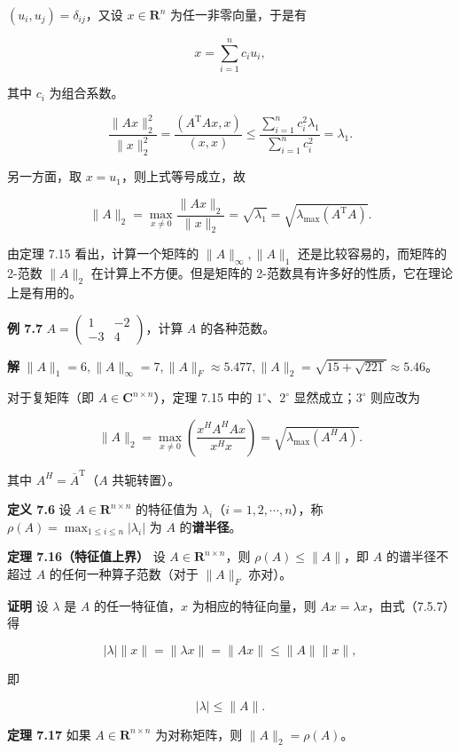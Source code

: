 \((u_i,u_j)=\delta_{ij}\)，又设 \(x\in\mathbf R^n\) 为任一非零向量，于是有

\[
x=\sum_{i=1}^{n}c_iu_i,
\]

其中 \(c_i\) 为组合系数。

\[
\frac{\|Ax\|_2^2}{\|x\|_2^2}
=\frac{(A^{\mathrm T}Ax,x)}{(x,x)}
\leqslant\frac{\sum_{i=1}^{n}c_i^2\lambda_1}{\sum_{i=1}^{n}c_i^2}=\lambda_1.
\]

另一方面，取 \(x=u_1\)，则上式等号成立，故

\[
\|A\|_2=\max_{x\neq0}\frac{\|Ax\|_2}{\|x\|_2}=\sqrt{\lambda_1}=\sqrt{\lambda_{\max}(A^{\mathrm T}A)}.
\]

由定理 7.15 看出，计算一个矩阵的 \(\|A\|_\infty,\|A\|_1\) 还是比较容易的，而矩阵的 2-范数 \(\|A\|_2\) 在计算上不方便。但是矩阵的 2-范数具有许多好的性质，它在理论上是有用的。

\textbf{例 7.7} \(A=\begin{pmatrix}1&-2\\-3&4\end{pmatrix}\)，计算 \(A\) 的各种范数。

\textbf{解} \(\|A\|_1=6,\|A\|_\infty=7,\|A\|_F\approx5.477,\|A\|_2=\sqrt{15+\sqrt{221}}\approx5.46\)。

对于复矩阵（即 \(A\in\mathbf C^{n\times n}\)），定理 7.15 中的 \(1^\circ\)、\(2^\circ\) 显然成立；\(3^\circ\) 则应改为

\[
\|A\|_2=\max_{x\neq0}\left(\frac{x^HA^HAx}{x^Hx}\right)=\sqrt{\lambda_{\max}(A^HA)}.
\]

其中 \(A^H=\overline A^{\mathrm T}\)（\(A\) 共轭转置）。

\textbf{定义 7.6} 设 \(A\in\mathbf R^{n\times n}\) 的特征值为 \(\lambda_i\)（\(i=1,2,\cdots,n\)），称 \(\rho(A)=\max_{1\leqslant i\leqslant n}|\lambda_i|\) 为 \(A\) 的\textbf{谱半径}。

\textbf{定理 7.16（特征值上界）} 设 \(A\in\mathbf R^{n\times n}\)，则 \(\rho(A)\leqslant\|A\|\)，即 \(A\) 的谱半径不超过 \(A\) 的任何一种算子范数（对于 \(\|A\|_F\) 亦对）。

\textbf{证明} 设 \(\lambda\) 是 \(A\) 的任一特征值，\(x\) 为相应的特征向量，则 \(Ax=\lambda x\)，由式（7.5.7）得

\[
|\lambda|\|x\|=\|\lambda x\|=\|Ax\|\leqslant\|A\|\|x\|,
\]

即

\[
|\lambda|\leqslant\|A\|.
\]

\textbf{定理 7.17} 如果 \(A\in\mathbf R^{n\times n}\) 为对称矩阵，则 \(\|A\|_2=\rho(A)\)。

